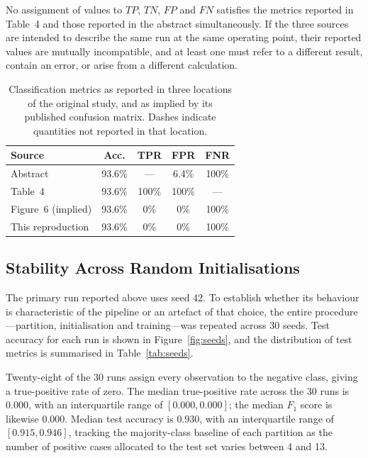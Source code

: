 No assignment of values to $TP$, $TN$, $FP$ and $FN$ satisfies the metrics
reported in Table~4 and those reported in the abstract simultaneously. If the
three sources are intended to describe the same run at the same operating
point, their reported values are mutually incompatible, and at least one must
refer to a different result, contain an error, or arise from a different
calculation.

\begin{table}[t]
\centering
\footnotesize
\caption{Classification metrics as reported in three locations of the original
study, and as implied by its published confusion matrix. Dashes indicate
quantities not reported in that location.}
\label{tab:consistency}
\renewcommand{\arraystretch}{1.2}
\begin{tabular}{@{}lcccc@{}}
\toprule
\textbf{Source} & \textbf{Acc.} & \textbf{TPR} & \textbf{FPR} & \textbf{FNR} \\
\midrule
Abstract              & 93.6\% & ---    & 6.4\%  & 100\% \\
Table~4               & 93.6\% & 100\%  & 100\%  & ---   \\
Figure~6 (implied)    & 93.6\% & 0\%    & 0\%    & 100\% \\
\midrule
This reproduction     & 93.6\% & 0\%    & 0\%    & 100\% \\
\bottomrule
\end{tabular}
\end{table}

\subsection{Stability Across Random Initialisations}\label{sec:seeds}

The primary run reported above uses seed 42. To establish whether its behaviour
is characteristic of the pipeline or an artefact of that choice, the entire
procedure---partition, initialisation and training---was repeated across 30
seeds. Test accuracy for each run is shown in Figure~\ref{fig:seeds}, and the
distribution of test metrics is summarised in Table~\ref{tab:seeds}.

Twenty-eight of the 30 runs assign every observation to the negative class,
giving a true-positive rate of zero. The median true-positive rate across the
30 runs is $0.000$, with an interquartile range of $[0.000, 0.000]$; the median
$F_1$ score is likewise $0.000$. Median test accuracy is $0.930$, with an
interquartile range of $[0.915, 0.946]$, tracking the majority-class baseline
of each partition as the number of positive cases allocated to the test set
varies between 4 and 13.

